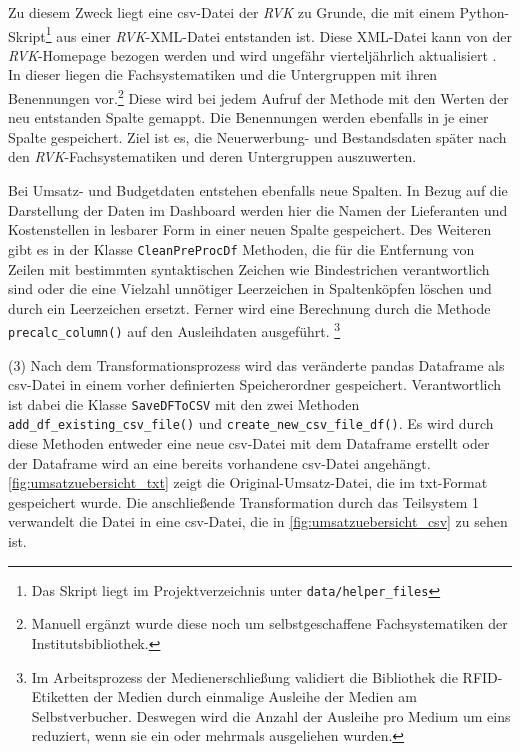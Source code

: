     Zu diesem Zweck liegt eine csv-Datei der \textit{\acrshort{RVK}} zu Grunde, die mit einem Python-Skript\footnote{Das Skript liegt im Projektverzeichnis
    unter \texttt{data/helper\_files}} aus einer \textit{\acrshort{RVK}}-XML-Datei entstanden ist.
    Diese XML-Datei kann von der \textit{\acrshort{RVK}}-Homepage bezogen werden und wird ungefähr vierteljährlich aktualisiert \cite[Vgl.][]{rvk_rvk_2021}.
    In dieser liegen die Fachsystematiken und die Untergruppen mit ihren Benennungen vor.\footnote{Manuell ergänzt wurde diese noch um selbstgeschaffene Fachsystematiken der Institutsbibliothek.}
    Diese wird bei jedem Aufruf der Methode mit den Werten der neu entstanden Spalte gemappt. Die Benennungen werden ebenfalls in je einer Spalte gespeichert.
    Ziel ist es, die Neuerwerbung- und Bestandsdaten später nach den \textit{\acrshort{RVK}}-Fachsystematiken und deren Untergruppen auszuwerten.
    
    
    Bei Umsatz- und Budgetdaten entstehen ebenfalls neue Spalten. In Bezug auf die Darstellung der Daten im Dashboard werden
    hier die Namen der Lieferanten und Kostenstellen in lesbarer Form in einer neuen Spalte gespeichert. 
    Des Weiteren gibt es in der Klasse \texttt{CleanPreProcDf} Methoden, die für die Entfernung von Zeilen mit bestimmten syntaktischen Zeichen wie Bindestrichen 
    verantwortlich sind oder die eine Vielzahl unnötiger Leerzeichen in Spaltenköpfen löschen  und durch ein Leerzeichen ersetzt.
    Ferner wird eine Berechnung durch die Methode \texttt{precalc\_column()} auf den Ausleihdaten ausgeführt.
    \footnote{Im Arbeitsprozess der Medienerschließung validiert die Bibliothek die RFID-Etiketten der Medien durch einmalige Ausleihe der Medien am Selbstverbucher.
    Deswegen wird die Anzahl der Ausleihe pro Medium um eins reduziert, wenn sie ein oder mehrmals ausgeliehen wurden.}
     
    (3) Nach dem Transformationsprozess wird das veränderte pandas Dataframe als csv-Datei in einem vorher definierten Speicherordner gespeichert. 
    Verantwortlich ist dabei die Klasse \texttt{SaveDFToCSV} mit den zwei Methoden \texttt{add\_df\_existing\_csv\_file()} und 
    \texttt{create\_new\_csv\_file\_df()}. 
    Es wird durch diese Methoden entweder eine neue csv-Datei mit dem Dataframe erstellt oder der Dataframe wird an eine bereits vorhandene csv-Datei angehängt.
    \autoref{fig:umsatzuebersicht_txt} zeigt die Original-Umsatz-Datei, die im txt-Format gespeichert wurde. Die anschließende Transformation durch das Teilsystem 1
    verwandelt die Datei in eine csv-Datei, die in \autoref{fig:umsatzuebersicht_csv} zu sehen ist.


